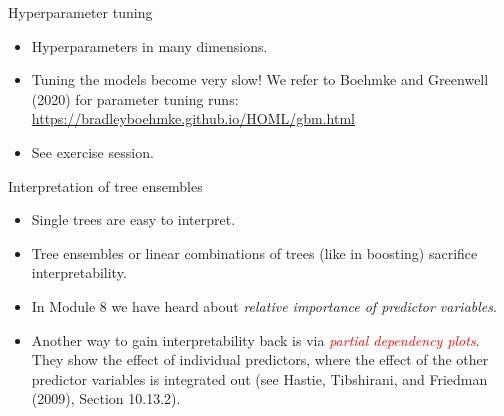 \documentclass[
  10pt,
  ignorenonframetext,
]{beamer}
\providecommand{\tightlist}{%
  \setlength{\itemsep}{0pt}\setlength{\parskip}{0pt}}
\begin{document}
\begin{frame}
\begin{block}{Hyperparameter tuning}
\protect\hypertarget{hyperparameter-tuning}{}
\(~\)

\begin{itemize}
\tightlist
\item
  Hyperparameters in many dimensions.
\end{itemize}

\vspace{2mm}

\begin{itemize}
\tightlist
\item
  Tuning the models become very slow! We refer to Boehmke and Greenwell
  (2020) for parameter tuning runs:\\
  \url{https://bradleyboehmke.github.io/HOML/gbm.html}
\end{itemize}

\vspace{2mm}

\begin{itemize}
\tightlist
\item
  See exercise session.
\end{itemize}
\end{block}
\end{frame}

\begin{frame}{Interpretation of tree ensembles}
\protect\hypertarget{interpretation-of-tree-ensembles}{}
\(~\)

\begin{itemize}
\tightlist
\item
  Single trees are easy to interpret.
\end{itemize}

\vspace{2mm}

\begin{itemize}
\tightlist
\item
  Tree ensembles or linear combinations of trees (like in boosting)
  sacrifice interpretability.
\end{itemize}

\vspace{2mm}

\begin{itemize}
\tightlist
\item
  In Module 8 we have heard about \emph{relative importance of predictor
  variables}.
\end{itemize}

\vspace{2mm}

\begin{itemize}
\tightlist
\item
  Another way to gain interpretability back is via
  \emph{\textcolor{red}{partial dependency plots}}. They show the effect
  of individual predictors, where the effect of the other predictor
  variables is integrated out (see Hastie, Tibshirani, and Friedman
  (2009), Section 10.13.2).
\end{itemize}
\end{frame}
\end{document}
